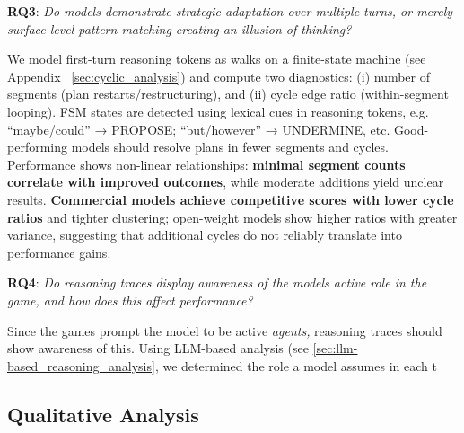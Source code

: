 \documentclass[11pt]{article}
\begin{document}
\textbf{RQ3}: \textit{Do models demonstrate strategic adaptation over multiple turns, or merely surface-level pattern matching creating an illusion of thinking?}

We model first-turn reasoning tokens as walks on a finite-state machine (see Appendix ~\ref{sec:cyclic_analysis}) and compute two diagnostics: (i) number of segments (plan restarts/restructuring), and (ii) cycle edge ratio (within-segment looping). FSM states are detected using lexical cues in reasoning tokens, e.g. ``maybe/could'' → PROPOSE; ``but/however'' → UNDERMINE, etc.
Good-performing models should resolve plans in fewer segments and cycles. Performance shows non-linear relationships: \textbf{minimal segment counts correlate with improved outcomes}, while moderate additions yield unclear results. \textbf{Commercial models achieve competitive scores with lower cycle ratios} and tighter clustering; open-weight models show higher ratios with greater variance, suggesting that additional cycles do not reliably translate into performance gains.

\textbf{RQ4}: \textit{Do reasoning traces display awareness of the models active role in the game, and how does this affect performance?}

Since the games prompt the model to be active \textit{agents,} reasoning traces should show awareness of this. Using LLM-based analysis (see \ref{sec:llm-based_reasoning_analysis}, we determined the role a model assumes in each t

\subsection{Qualitative Analysis}
\end{document}
